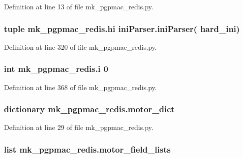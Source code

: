Definition at line 13 of file mk\-\_\-pgpmac\-\_\-redis.\-py.

\hypertarget{namespacemk__pgpmac__redis_af0e472a4df25fc5c1660ef07226689a8}{
\subsubsection[{hi}]{\setlength{\rightskip}{0pt plus 5cm}tuple mk\-\_\-pgpmac\-\_\-redis.\-hi {\bf ini\-Parser.\-ini\-Parser}( {\bf hard\-\_\-ini})}}\label{namespacemk__pgpmac__redis_af0e472a4df25fc5c1660ef07226689a8}


Definition at line 320 of file mk\-\_\-pgpmac\-\_\-redis.\-py.

\hypertarget{namespacemk__pgpmac__redis_afa643a23a5984fe44c2182ada3dfa401}{
\subsubsection[{i}]{\setlength{\rightskip}{0pt plus 5cm}int mk\-\_\-pgpmac\-\_\-redis.\-i 0}}\label{namespacemk__pgpmac__redis_afa643a23a5984fe44c2182ada3dfa401}


Definition at line 368 of file mk\-\_\-pgpmac\-\_\-redis.\-py.

\hypertarget{namespacemk__pgpmac__redis_ad8583d4fe88c4c98af73d2858c51c660}{
\subsubsection[{motor\-\_\-dict}]{\setlength{\rightskip}{0pt plus 5cm}dictionary mk\-\_\-pgpmac\-\_\-redis.\-motor\-\_\-dict}}\label{namespacemk__pgpmac__redis_ad8583d4fe88c4c98af73d2858c51c660}


Definition at line 29 of file mk\-\_\-pgpmac\-\_\-redis.\-py.

\hypertarget{namespacemk__pgpmac__redis_a7228dc1b6ecec376538db1efe8c05ffb}{
\subsubsection[{motor\-\_\-field\-\_\-lists}]{\setlength{\rightskip}{0pt plus 5cm}list mk\-\_\-pgpmac\-\_\-redis.\-motor\-\_\-field\-\_\-lists}}\label{namespacemk__pgpmac__redis_a7228dc1b6ecec376538db1efe8c05ffb}


